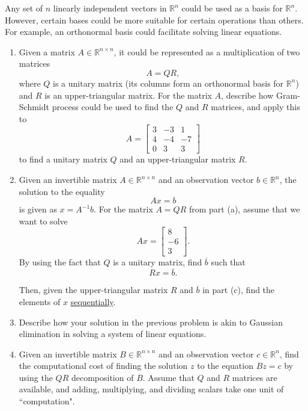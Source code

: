 \newline
Any set of $n$ linearly independent vectors in $\mathbb R^n$ could be used as a basis for $\mathbb R^n$. However, certain bases could be more suitable for certain operations than others. For example, an orthonormal basis could facilitate solving linear equations.

\begin{enumerate}

\item Given a matrix $A \in \mathbb R^{n \times n}$, it could be represented as a multiplication of two matrices
\[ A = Q R, \]
where $Q$ is a unitary matrix (its columns form an orthonormal basis for $\mathbb R^n$) and $R$ is an upper-triangular matrix. For the matrix $A$, describe how Gram-Schmidt process could be used to find the $Q$ and $R$ matrices, and apply this to 
\[ A = 
\begin{bmatrix} 3 & -3 & 1\\
4 & -4 & -7 \\
0 & 3 & 3
\end{bmatrix}
\] 
to find a unitary matrix $Q$ and an upper-triangular matrix $R$.

\sol{}

\item Given an invertible matrix $A \in \mathbb R^{n \times n}$ and an observation vector $b \in \mathbb R^n$, the solution to the equality
 \[ A x = b \]
is given as $x = A^{-1}b$. For the matrix $A = QR$ from part (a), assume that we want to solve
\[ A x = \begin{bmatrix}
8 \\ -6 \\ 3
\end{bmatrix}. \]
By using the fact that $Q$ is a unitary matrix, find $\overline b$ such that
\[ R x = \overline b. \]

Then, given the upper-triangular matrix $R$ and $\overline b$ in part (c), find the elements of $x$ \underline{sequentially}.

\sol{}

\item Describe how your solution in the previous problem is akin to Gaussian elimination in solving a system of linear equations.

\sol{}

\item Given an invertible matrix $B \in \mathbb R^{n \times n}$ and an observation vector $c \in \mathbb R^n$, find the computational cost of finding the solution $z$ to the equation $Bz = c$ by using the $QR$ decomposition of $B$. Assume that $Q$ and $R$ matrices are available, and adding, multiplying, and dividing scalars take one unit of ``computation". 


\end{enumerate}
